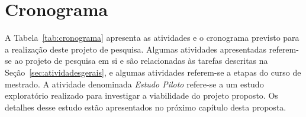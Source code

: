\section{Cronograma}

A Tabela~\ref{tab:cronograma} apresenta as atividades e o cronograma previsto para a realização deste projeto de pesquisa. Algumas atividades apresentadas referem-se ao projeto de pesquisa em si e são relacionadas às tarefas descritas na Seção~\ref{sec:atividadesgerais}, e algumas atividades referem-se a etapas do curso de mestrado. A atividade denominada \emph{Estudo Piloto} refere-se a um estudo exploratório realizado para investigar a viabilidade do projeto proposto. Os detalhes desse estudo estão apresentados no próximo capítulo desta proposta.


\newcommand{\y}{\rule{18,5pt}{5pt}}
\newcommand{\x}{\hspace*{5pt}}
